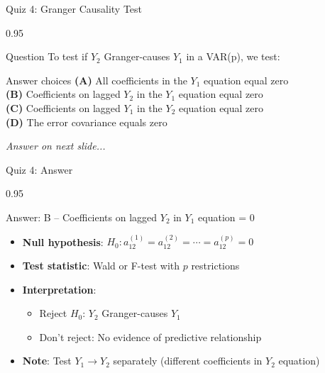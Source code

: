 \documentclass[9pt, aspectratio=169, t]{beamer}
\begin{document}
\begin{frame}{Quiz 4: Granger Causality Test}
    \begin{cminipage}{0.95\textwidth}
    \begin{alertblock}{Question}
        To test if $Y_2$ Granger-causes $Y_1$ in a VAR(p), we test:
    \end{alertblock}

    \vspace{0.4cm}

    \begin{block}{Answer choices}
        \textcolor{MainBlue}{\textbf{(A)}} All coefficients in the $Y_1$ equation equal zero\\[3pt]
        \textcolor{MainBlue}{\textbf{(B)}} Coefficients on lagged $Y_2$ in the $Y_1$ equation equal zero\\[3pt]
        \textcolor{MainBlue}{\textbf{(C)}} Coefficients on lagged $Y_1$ in the $Y_2$ equation equal zero\\[3pt]
        \textcolor{MainBlue}{\textbf{(D)}} The error covariance equals zero
    \end{block}

    \vspace{0.5cm}

    \begin{center}
        \textit{Answer on next slide...}
    \end{center}
    \end{cminipage}
\end{frame}

\begin{frame}{Quiz 4: Answer}
    \begin{cminipage}{0.95\textwidth}
    \begin{exampleblock}{Answer: B -- Coefficients on lagged $Y_2$ in $Y_1$ equation = 0}
        \begin{itemize}\setlength{\itemsep}{0pt}
            \item \textbf{Null hypothesis}: $H_0: a_{12}^{(1)} = a_{12}^{(2)} = \cdots = a_{12}^{(p)} = 0$
            \item \textbf{Test statistic}: Wald or F-test with $p$ restrictions
            \item \textbf{Interpretation}:
            \begin{itemize}\setlength{\itemsep}{0pt}
                \item Reject $H_0$: $Y_2$ Granger-causes $Y_1$
                \item Don't reject: No evidence of predictive relationship
            \end{itemize}
            \item \textbf{Note}: Test $Y_1 \to Y_2$ separately (different coefficients in $Y_2$ equation)
        \end{itemize}
    \end{exampleblock}

    \end{cminipage}
\end{frame}
\end{document}
